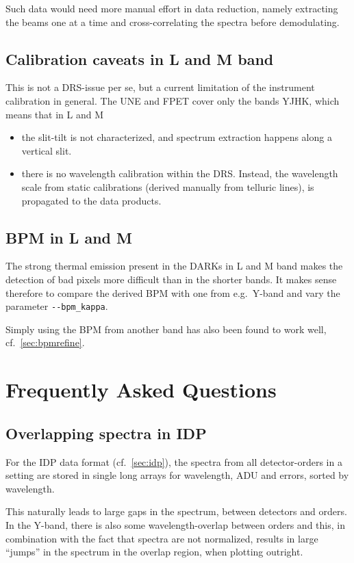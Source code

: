 Such data would need more manual effort in data reduction, namely extracting the
beams one at a time and cross-correlating the spectra before demodulating.


\subsection{Calibration caveats in L and M band}

This is not a DRS-issue per se, but a current limitation of the instrument
calibration in general. The UNE and FPET cover only the bands YJHK, which means
that in L and M
\begin{itemize}
    \item the slit-tilt is not characterized, and spectrum extraction happens
    along a vertical slit.
    \item there is no wavelength calibration within the DRS. Instead, the
    wavelength scale from static calibrations (derived manually from telluric
    lines), is propagated to the data products.
\end{itemize}


\subsection{BPM in L and M}

The strong thermal emission present in the DARKs in L and M band makes the
detection of bad pixels more difficult than in the shorter bands. It makes sense
therefore to compare the derived BPM with one from e.g.~Y-band and vary the
parameter \verb!--bpm_kappa!.

Simply using the BPM from another band has also been found to work well,
cf.~\ref*{sec:bpmrefine}.


\section{Frequently Asked Questions}

\subsection{Overlapping spectra in IDP}

For the IDP data format (cf.~\ref{sec:idp}), the spectra from all
detector-orders in a setting are stored in single long arrays for wavelength,
ADU and errors, sorted by wavelength.

This naturally leads to large gaps in the spectrum, between detectors and
orders. In the Y-band, there is also some wavelength-overlap between orders and
this, in combination with the fact that spectra are not normalized, results in
large ``jumps'' in the spectrum in the overlap region, when plotting outright.

